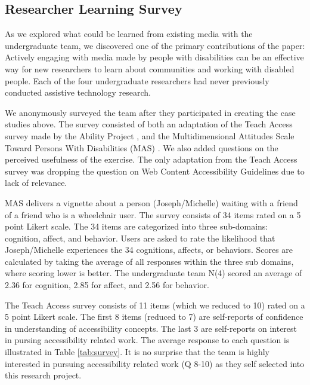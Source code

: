 \subsection{Researcher Learning Survey}\label{survey}
As we explored what could be learned from existing media with the undergraduate team, we discovered one of the primary contributions of the paper: Actively engaging with media made by people with disabilities can be an effective way for new researchers to learn about communities and working with disabled people. Each of the four undergraduate researchers had never previously conducted assistive technology research. 

We anonymously surveyed the team after they participated in creating the case studies above. The survey consisted of both an adaptation of the Teach Access survey made by the Ability Project \cite{kearney-volpeEvaluatingInstructorStrategy2019}, and the Multidimensional Attitudes Scale Toward Persons With Disabilities (MAS) \cite{findlerMultidimensionalAttitudesScale2007}. We also added questions on the perceived usefulness of the exercise. The only adaptation from the Teach Access survey was dropping the question on Web Content Accessibility Guidelines due to lack of relevance. 

MAS delivers a vignette about a person (Joseph/Michelle) waiting with a friend of a friend who is a wheelchair user. The survey consists of 34 items rated on a 5 point Likert scale. The 34 items are categorized into three sub-domains: cognition, affect, and behavior. Users are asked to rate the likelihood that Joseph/Michelle experiences the 34 cognitions, affects, or behaviors. Scores are calculated by taking the average of all responses within the three sub domains, where scoring lower is better. The undergraduate team N(4) scored an average of 2.36 for cognition, 2.85 for affect, and 2.56 for behavior.  

The Teach Access survey consists of 11 items (which we reduced to 10) rated on a 5 point Likert scale. The first 8 items (reduced to 7) are self-reports of confidence in understanding of accessibility concepts. The last 3 are self-reports on interest in pursing accessibility related work. The average response to each question is illustrated in Table \ref{tab:survey}. It is no surprise that the team is highly interested in pursuing accessibility related work (Q 8-10) as they self selected into this research project. 


